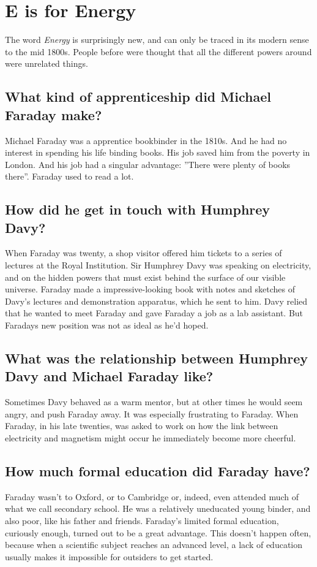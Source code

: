 %
\newpage
\section{E is for Energy}

The word \emph{Energy} is surprisingly new, and can only be traced in its modern sense to the mid 1800s. People before were thought that all the different powers around were unrelated things.

\subsection*{What kind of apprenticeship did Michael Faraday make?}
Michael Faraday was a apprentice bookbinder in the 1810s. And he had no interest in spending his life binding books. His job saved him from the poverty in London. And his job had a singular advantage: ''There were plenty of books there''. Faraday used to read a lot.

\subsection*{How did he get in touch with Humphrey Davy?}
When Faraday was twenty, a shop visitor offered him tickets to a series of lectures at the Royal Institution. Sir Humphrey Davy was speaking on electricity, and on the hidden powers that must exist behind the surface of our visible universe. Faraday made a impressive-looking book with notes and sketches of Davy's lectures and demonstration apparatus, which he sent to him. Davy relied that he wanted to meet Faraday and gave Faraday a job as a lab assistant. But Faradays new position was not as ideal as he'd hoped.

\subsection*{What was the relationship between Humphrey Davy and Michael Faraday like?}
Sometimes Davy behaved as a warm mentor, but at other times he would seem angry, and push Faraday away. It was especially frustrating to Faraday. When Faraday, in his late twenties, was asked to work on how the link between electricity and magnetism might occur he immediately become more cheerful.

\subsection*{How much formal education did Faraday have?}
Faraday wasn't to Oxford, or to Cambridge or, indeed, even attended much of what we call secondary school. He was a relatively uneducated young binder, and also poor, like his father and friends. Faraday's limited formal education, curiously enough, turned out to be a great advantage. This doesn't happen often, because when a scientific subject reaches an advanced level, a lack of education usually makes it impossible for outsiders to get started.

